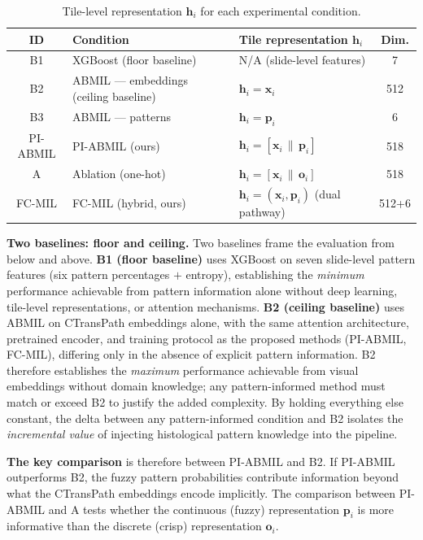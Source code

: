 \begin{table}[ht!]
\centering
\caption{Tile-level representation $\mathbf{h}_i$ for each experimental condition.}
\label{tab:tile_representations}
\small
\begin{tabular}{c l l c}
\hline
\textbf{ID} & \textbf{Condition} & \textbf{Tile representation $\mathbf{h}_i$} & \textbf{Dim.} \\
\hline
B1 & XGBoost (floor baseline) & N/A (slide-level features) & 7 \\
B2 & ABMIL --- embeddings (ceiling baseline) & $\mathbf{h}_i = \mathbf{x}_i$ & 512 \\
B3 & ABMIL --- patterns & $\mathbf{h}_i = \mathbf{p}_i$ & 6 \\
PI-ABMIL  & PI-ABMIL (ours) & $\mathbf{h}_i = [\mathbf{x}_i \,\|\, \mathbf{p}_i]$ & 518 \\
A  & Ablation (one-hot) & $\mathbf{h}_i = [\mathbf{x}_i \,\|\, \mathbf{o}_i]$ & 518 \\
FC-MIL & FC-MIL (hybrid, ours) & $\mathbf{h}_i = (\mathbf{x}_i, \mathbf{p}_i)$ (dual pathway) & 512+6 \\
\hline
\end{tabular}
\end{table}

\textbf{Two baselines: floor and ceiling.}
Two baselines frame the evaluation from below and above.
\textbf{B1 (floor baseline)} uses XGBoost on seven slide-level pattern
features (six pattern percentages $+$ entropy), establishing the
\emph{minimum} performance achievable from pattern information alone
without deep learning, tile-level representations, or attention
mechanisms.
\textbf{B2 (ceiling baseline)} uses ABMIL on CTransPath embeddings
alone, with the same attention architecture, pretrained encoder, and
training protocol as the proposed methods (PI-ABMIL, FC-MIL),
differing only in the absence of explicit pattern information.
B2 therefore establishes the \emph{maximum} performance achievable
from visual embeddings without domain knowledge; any pattern-informed
method must match or exceed B2 to justify the added complexity.
By holding everything else constant, the delta between any
pattern-informed condition and B2 isolates the \emph{incremental value}
of injecting histological pattern knowledge into the pipeline.

\textbf{The key comparison} is therefore between PI-ABMIL and B2.
If PI-ABMIL outperforms B2, the fuzzy pattern probabilities contribute information beyond what the CTransPath embeddings encode implicitly.
The comparison between PI-ABMIL and A tests whether the continuous (fuzzy) representation $\mathbf{p}_i$ is more informative than the discrete (crisp) representation $\mathbf{o}_i$.

